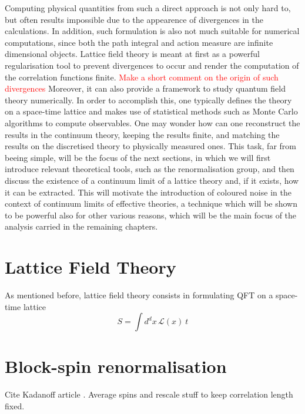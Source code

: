 Computing physical quantities from such a direct approach is not only hard to, but often results impossible due to the appearence of divergences in the calculations.  In addition, such formulation is also not much suitable for numerical computations, since both the path integral and action measure are infinite dimensional objects. Lattice field theory is meant at first as a powerful regularisation tool to prevent divergences to occur and render the computation of the correlation functions finite. \textcolor{red}{Make a short comment on the origin of such divergences} Moreover, it can also provide a framework to study quantum field theory numerically. In order to accomplish this, one typically defines the theory on a space-time lattice and makes use of statistical methods such as Monte Carlo algorithms to compute observables. One may wonder how can one reconstruct the results in the continuum theory, keeping the results finite, and matching the results on the discretised theory to physically measured ones. This task, far from beeing simple, will be the focus of the next sections, in which we will first introduce relevant theoretical tools, such as the renormalisation group, and then discuss the existence of a continuum limit of a lattice theory and, if it exists, how it can be extracted. This will motivate the introduction of coloured noise in the context of continuum limits of effective theories, a technique which will be shown to be powerful also for other various reasons, which will be the main focus of the analysis carried in the remaining chapters.

\section{Lattice Field Theory}
\label{sec:lattice_formulation}
As mentioned before, lattice field theory consists in formulating QFT on a space-time lattice
\begin{equation*}
	S = \int d^dx \, \mathcal{L}(x) \ t
\end{equation*}

\section{Block-spin renormalisation}
\label{sec:blockspin}
Cite Kadanoff article \cite{PhysicsPhysiqueFizika.2.263}. Average spins and rescale stuff to keep correlation length fixed.

